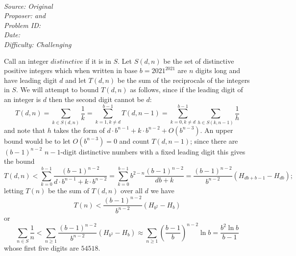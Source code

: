 \SSbreak\\
\emph{Source: Original}\\
\emph{Proposer: \Ptan and \Pwen}\\
\emph{Problem ID:}\\
\emph{Date: }\\
\emph{Difficulty: Challenging}\\
\SSbreak

\bigskip

\begin{solution}\hfil\medskip
  
    Call an integer $\textit{distinctive}$ if it is in $S$. Let $S(d, n)$ be the set of distinctive positive integers which when written in base $b = 2021^{2021}$ are $n$ digits long and have leading digit $d$
    and let $T(d, n)$ be the sum of the reciprocals of the integers in $S$. We will attempt to bound $T(d, n)$ as follows, since if the leading digit of an integer is $d$ then the second digit cannot be $d$:
    $$T(d, n) = \sum_{k \in S(d, n)} \dfrac{1}{k} = \sum_{k = 1, k \neq d}^{b - 1} T(d, n - 1) = \sum_{k = 0, k \neq d}^{b - 1} \sum_{h \in S(k, n - 1)} \dfrac{1}{h}$$
    and note that $h$ takes the form of $d \cdot b^{n - 1} + k \cdot b^{n - 2} + O\left(b^{n - 3}\right)$. 
    An upper bound would be to let $O\left(b^{n - 3}\right) = 0$ and count $T(d, n - 1)$; since there are $(b - 1)^{n - 2}$ $n - 1$-digit distinctive numbers with a fixed leading digit this gives the bound
    $$T(d, n) < \sum_{k = 0}^{b - 1} \dfrac{(b - 1)^{n - 2}}{d \cdot b^{n - 1} + k \cdot b^{n - 2}} = \sum_{k = 0}^{b - 1} b^{2 - n} \dfrac{(b - 1)^{n - 2}}{db + k} = \dfrac{(b - 1)^{n - 2}}{b^{n - 2}} \left(H_{db + b - 1} - H_{db}\right);$$
    letting $T(n)$ be the sum of $T(d, n)$ over all $d$ we have $$T(n) < \dfrac{(b - 1)^{n - 2}}{b^{n - 2}} \left(H_{b^2} - H_b\right)$$
    or $$\sum_{n \in S} \dfrac{1}{n} < \sum_{n \geq 1} \dfrac{(b - 1)^{n - 2}}{b^{n - 2}} \left(H_{b^2} - H_b\right) \approx \sum_{n \geq 1} \left(\dfrac{b - 1}{b}\right)^{n - 2} \ln b = \dfrac{b^2 \ln b}{b - 1}$$
    whose first five digits are $54518$. \medskip


\end{solution}
